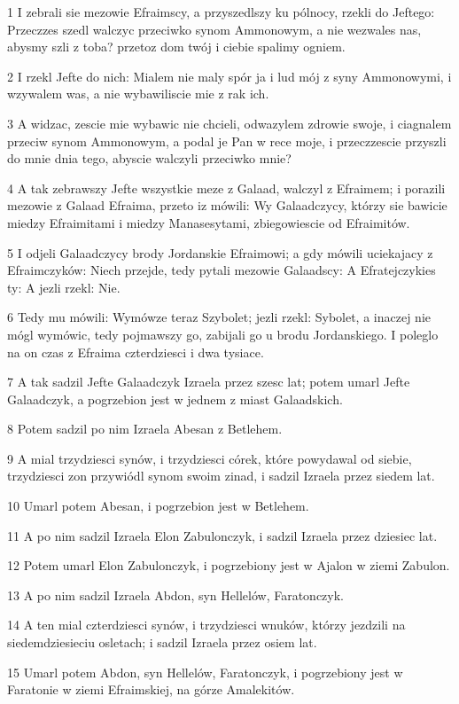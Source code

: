 \par 1 I zebrali sie mezowie Efraimscy, a przyszedlszy ku pólnocy, rzekli do Jeftego: Przeczzes szedl walczyc przeciwko synom Ammonowym, a nie wezwales nas, abysmy szli z toba? przetoz dom twój i ciebie spalimy ogniem.
\par 2 I rzekl Jefte do nich: Mialem nie maly spór ja i lud mój z syny Ammonowymi, i wzywalem was, a nie wybawiliscie mie z rak ich.
\par 3 A widzac, zescie mie wybawic nie chcieli, odwazylem zdrowie swoje, i ciagnalem przeciw synom Ammonowym, a podal je Pan w rece moje, i przeczzescie przyszli do mnie dnia tego, abyscie walczyli przeciwko mnie?
\par 4 A tak zebrawszy Jefte wszystkie meze z Galaad, walczyl z Efraimem; i porazili mezowie z Galaad Efraima, przeto iz mówili: Wy Galaadczycy, którzy sie bawicie miedzy Efraimitami i miedzy Manasesytami, zbiegowiescie od Efraimitów.
\par 5 I odjeli Galaadczycy brody Jordanskie Efraimowi; a gdy mówili uciekajacy z Efraimczyków: Niech przejde, tedy pytali mezowie Galaadscy: A Efratejczykies ty: A jezli rzekl: Nie.
\par 6 Tedy mu mówili: Wymówze teraz Szybolet; jezli rzekl: Sybolet, a inaczej nie mógl wymówic, tedy pojmawszy go, zabijali go u brodu Jordanskiego. I poleglo na on czas z Efraima czterdziesci i dwa tysiace.
\par 7 A tak sadzil Jefte Galaadczyk Izraela przez szesc lat; potem umarl Jefte Galaadczyk, a pogrzebion jest w jednem z miast Galaadskich.
\par 8 Potem sadzil po nim Izraela Abesan z Betlehem.
\par 9 A mial trzydziesci synów, i trzydziesci córek, które powydawal od siebie, trzydziesci zon przywiódl synom swoim zinad, i sadzil Izraela przez siedem lat.
\par 10 Umarl potem Abesan, i pogrzebion jest w Betlehem.
\par 11 A po nim sadzil Izraela Elon Zabulonczyk, i sadzil Izraela przez dziesiec lat.
\par 12 Potem umarl Elon Zabulonczyk, i pogrzebiony jest w Ajalon w ziemi Zabulon.
\par 13 A po nim sadzil Izraela Abdon, syn Hellelów, Faratonczyk.
\par 14 A ten mial czterdziesci synów, i trzydziesci wnuków, którzy jezdzili na siedemdziesieciu osletach; i sadzil Izraela przez osiem lat.
\par 15 Umarl potem Abdon, syn Hellelów, Faratonczyk, i pogrzebiony jest w Faratonie w ziemi Efraimskiej, na górze Amalekitów.


